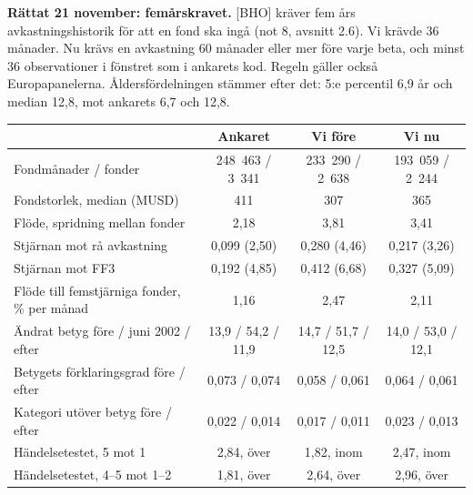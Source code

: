 \documentclass[10pt,a4paper]{article}
\begin{document}
\textbf{Rättat 21 november: femårskravet.} [BHO] kräver fem års avkastningshistorik för att en fond ska ingå (not 8, avsnitt 2.6). Vi krävde 36 månader. Nu krävs en avkastning 60 månader eller mer före varje beta, och minst 36 observationer i fönstret som i ankarets kod. Regeln gäller också Europapanelerna. Åldersfördelningen stämmer efter det: 5:e percentil 6,9 år och median 12,8, mot ankarets 6,7 och 12,8.

\begin{center}\small
\begin{tabular}{lccc}
\toprule
 & Ankaret & Vi före & Vi nu \\
\midrule
Fondmånader / fonder & 248~463 / 3~341 & 233~290 / 2~638 & 193~059 / 2~244 \\
Fondstorlek, median (MUSD) & 411 & 307 & 365 \\
Flöde, spridning mellan fonder & 2,18 & 3,81 & 3,41 \\
Stjärnan mot rå avkastning & 0,099 (2,50) & 0,280 (4,46) & 0,217 (3,26) \\
Stjärnan mot FF3 & 0,192 (4,85) & 0,412 (6,68) & 0,327 (5,09) \\
Flöde till femstjärniga fonder, \% per månad & 1,16 & 2,47 & 2,11 \\
Ändrat betyg före / juni 2002 / efter & 13,9 / 54,2 / 11,9 & 14,7 / 51,7 / 12,5 & 14,0 / 53,0 / 12,1 \\
Betygets förklaringsgrad före / efter & 0,073 / 0,074 & 0,058 / 0,061 & 0,064 / 0,061 \\
Kategori utöver betyg före / efter & 0,022 / 0,014 & 0,017 / 0,011 & 0,023 / 0,013 \\
Händelsetestet, 5 mot 1 & 2,84, över & 1,82, inom & 2,47, inom \\
Händelsetestet, 4--5 mot 1--2 & 1,81, över & 2,64, över & 2,96, över \\
\bottomrule
\end{tabular}
\end{center}
\end{document}
